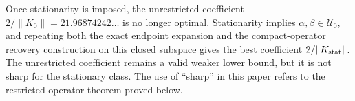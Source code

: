 Once stationarity is imposed, the unrestricted coefficient $2/\|K_0\|=21.96874242\ldots$ is no longer optimal. Stationarity implies $\alpha,\beta\in\mathcal U_0$, and repeating both the exact endpoint expansion and the compact-operator recovery construction on this closed subspace gives the best coefficient $2/\|K_{\rm stat}\|$. The unrestricted coefficient remains a valid weaker lower bound, but it is not sharp for the stationary class. The use of ``sharp'' in this paper refers to the restricted-operator theorem proved below.